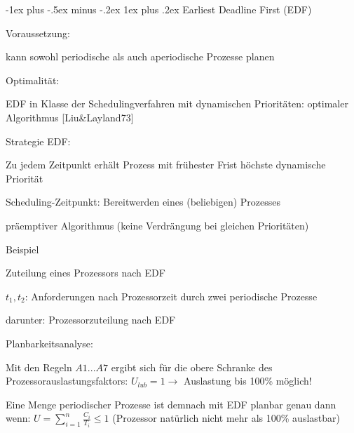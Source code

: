 \documentclass[a4paper]{article}
\makeatletter
\renewcommand{\subsubsection}{\@startsection{subsubsection}{3}{0mm}%
 {-1ex plus -.5ex minus -.2ex}%
 {1ex plus .2ex}%
 {\normalfont\small\bfseries}}
\makeatother
\begin{document}
\begin{multicols}{3}
    \subsubsection{Earliest Deadline First (EDF)}
    \begin{itemize*}
        \item Voraussetzung:
        \begin{itemize*}
            \item kann sowohl periodische als auch aperiodische Prozesse planen
        \end{itemize*}
        \item Optimalität:
        \begin{itemize*}
            \item EDF in Klasse der Schedulingverfahren mit dynamischen Prioritäten: optimaler Algorithmus [Liu\&Layland73]
        \end{itemize*}
        \item Strategie EDF:
        \begin{itemize*}
            \item Zu jedem Zeitpunkt erhält Prozess mit frühester Frist höchste dynamische Priorität
            \item Scheduling-Zeitpunkt: Bereitwerden eines (beliebigen) Prozesses
            \item präemptiver Algorithmus (keine Verdrängung bei gleichen Prioritäten)
        \end{itemize*}
        \item Beispiel
        \begin{itemize*}
            \item Zuteilung eines Prozessors nach EDF
            \item $t_1, t_2$: Anforderungen nach Prozessorzeit durch zwei periodische Prozesse
            \item darunter: Prozessorzuteilung nach EDF
        \end{itemize*}
        \item Planbarkeitsanalyse:
        \begin{itemize*}
            \item Mit den Regeln $A1 ... A7$ ergibt sich für die obere Schranke des Prozessorauslastungsfaktors: $U_{lub}= 1\rightarrow$ Auslastung bis 100\% möglich!
            \item Eine Menge periodischer Prozesse ist demnach mit EDF planbar genau dann wenn: $U=\sum_{i=1}^n \frac{C_i}{T_i}\leq 1$ (Prozessor natürlich nicht mehr als 100\% auslastbar)

\end{itemize*}
\end{itemize*}
\end{multicols}
\end{document}
